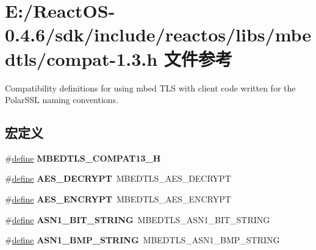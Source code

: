 \hypertarget{compat-1_83_8h}{}\section{E\+:/\+React\+O\+S-\/0.4.6/sdk/include/reactos/libs/mbedtls/compat-\/1.3.h 文件参考}
\label{compat-1_83_8h}


Compatibility definitions for using mbed T\+LS with client code written for the Polar\+S\+SL naming conventions.  


\subsection*{宏定义}
\begin{DoxyCompactItemize}
\item 
\mbox{\label{compat-1_83_8h_a1d4d0ff7cc5b7dcd678e43dbf3103c65}} 
\#\hyperlink{structdefine}{define} {\bfseries M\+B\+E\+D\+T\+L\+S\+\_\+\+C\+O\+M\+P\+A\+T13\+\_\+H}
\item 
\mbox{\label{compat-1_83_8h_a8a3cf36dc3c8860519f33907bad182c9}} 
\#\hyperlink{structdefine}{define} {\bfseries A\+E\+S\+\_\+\+D\+E\+C\+R\+Y\+PT}~M\+B\+E\+D\+T\+L\+S\+\_\+\+A\+E\+S\+\_\+\+D\+E\+C\+R\+Y\+PT
\item 
\mbox{\label{compat-1_83_8h_a91e721bca5c6db6402fc3a4781d69b10}} 
\#\hyperlink{structdefine}{define} {\bfseries A\+E\+S\+\_\+\+E\+N\+C\+R\+Y\+PT}~M\+B\+E\+D\+T\+L\+S\+\_\+\+A\+E\+S\+\_\+\+E\+N\+C\+R\+Y\+PT
\item 
\mbox{\label{compat-1_83_8h_a1493defdd429594af36feaf6309cc70a}} 
\#\hyperlink{structdefine}{define} {\bfseries A\+S\+N1\+\_\+\+B\+I\+T\+\_\+\+S\+T\+R\+I\+NG}~M\+B\+E\+D\+T\+L\+S\+\_\+\+A\+S\+N1\+\_\+\+B\+I\+T\+\_\+\+S\+T\+R\+I\+NG
\item 
\mbox{\label{compat-1_83_8h_ae17ad2492005596109a4179b6f22cc62}} 
\#\hyperlink{structdefine}{define} {\bfseries A\+S\+N1\+\_\+\+B\+M\+P\+\_\+\+S\+T\+R\+I\+NG}~M\+B\+E\+D\+T\+L\+S\+\_\+\+A\+S\+N1\+\_\+\+B\+M\+P\+\_\+\+S\+T\+R\+I\+NG
\item 
\mbox{\label{compat-1_83_8h_a5ecb3f6655f48694a6326657290d4996}} 

\end{DoxyCompactItemize}
